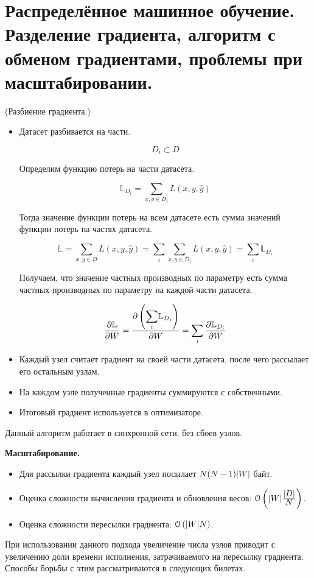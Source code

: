\section{Распределённое машинное обучение. Разделение градиента, алгоритм с
  обменом градиентами, проблемы при масштабировании.}

\begin{algorithm}(Разбиение градиента.)
  \begin{itemize}
    \item Датасет разбивается на части.

      $$D_i \subset D$$

      Определим функцию потерь на части датасета.

      $$\mathbb{L}_{D_i} = \sum_{x, y \in D_i} L(x, y, \hat{y})$$

      Тогда значение функции потерь на всем датасете есть сумма значений
      функции потерь на частях датасета.

      $$\mathbb{L} = \sum_{x, y \in D} L(x, y, \hat{y})
        = \sum_i \sum_{x, y \in D_i} L(x, y, \hat{y})
        = \sum_i \mathbb{L}_{D_i}$$

      Получаем, что значение частных производных по параметру есть сумма
      частных производных по параметру на каждой части датасета.

      $$\frac{\partial \mathbb{L}}{\partial W}
        = \frac{\partial \left( \mathlarger{\sum_i} \mathbb{L}_{D_i} \right)}
               {\partial W}
        = \sum_i \frac{\partial \mathbb{L}_{D_i}}{\partial W}$$
    \item Каждый узел считает градиент на своей части датасета, после чего
      рассылает его остальным узлам.
    \item На каждом узле полученные градиенты суммируются с собственными.
    \item Итоговый градиент используется в оптимизаторе.
  \end{itemize}
\end{algorithm}

\begin{remark} Данный алгоритм работает в синхронной сети, без сбоев узлов.
\end{remark}

\textbf{Масштабирование.}
\begin{itemize}
  \item Для рассылки градиента каждый узел посылает $N (N - 1) \lvert W\rvert$ байт.
  \item Оценка сложности вычисления градиента и обновления весов: $\mathcal{O}
    \left( \abs{W} \frac{\mathlarger{|D|}}{\mathlarger{N}} \right)$.
  \item Оценка сложности пересылки градиента: $\mathcal{O} \left( \lvert W\rvert N
    \right)$.
\end{itemize}

\begin{remark} При использовании данного подхода увеличение числа узлов приводит
  с увеличению доли времени исполнения, затрачиваемого на пересылку градиента.
  Способы борьбы с этим рассматриваются в следующих билетах.
\end{remark}

